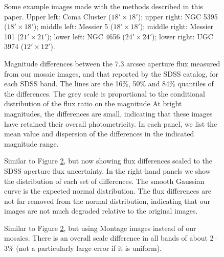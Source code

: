 \clearpage
{}
\begin{figure}
\figurenum{\fignum}
\caption{\label{fig:examples} Some example images made with the
  methods described in this paper. Upper left: Coma Cluster
  ($18'\times 18'$); upper right: NGC 5395 ($18'\times 18'$); middle
  left: Messier 5 ($18'\times18'$); middle right: Messier
  101 ($21'\times 21'$); lower left: NGC 4656 ($24'\times 24'$); lower
  right: UGC 3974 ($12'\times 12'$).}
\end{figure}

\clearpage
{}
\begin{figure}
\figurenum{\fignum}
\caption{\label{fig:sdss_qa_magdiff} Magnitude differences between
the 7.3 arcsec aperture flux measured from our mosaic images, and that
reported by the SDSS catalog, for each SDSS band. The lines are the
16\%, 50\% and 84\% quantiles of the differences. The grey scale is
proportional to the conditional distribution of the flux ratio on the
magnitude At bright magnitudes, the differences are small, indicating
that these images have retained their overall photometricity. In each
panel, we list the mean value and dispersion of the differences in the
indicated magnitude range. }
\end{figure}

\clearpage
{}
\begin{figure}
\figurenum{\fignum}
\caption{\label{fig:sdss_qa_scaled} Similar to Figure
\ref{fig:sdss_qa_magdiff}, but now showing flux differences scaled to
the SDSS aperture flux uncertainty. In the right-hand panels we show
the distribution of each set of differences.  The smooth Gaussian
curve is the expected normal distribution. The flux differences are
not far removed from the normal distribution, indicating that our
images are not much degraded relative to the original images.}
\end{figure}


\clearpage
{}
\begin{figure}
\figurenum{\fignum}
\caption{\label{fig:montage_qa_magdiff} Similar to Figure
\ref{fig:sdss_qa_magdiff}, but using Montage images instead of our
mosaics. There is an overall scale difference in all bands of about
2--3\% (not a particularly large error if it is uniform). }
\end{figure}

